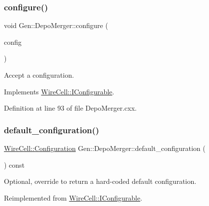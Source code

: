 \subsubsection{\texorpdfstring{configure()}{configure()}}
{\footnotesize\ttfamily void Gen\+::\+Depo\+Merger\+::configure (\begin{DoxyParamCaption}\item[{const \hyperlink{namespace_wire_cell_a9f705541fc1d46c608b3d32c182333ee}{Wire\+Cell\+::\+Configuration} \&}]{config }\end{DoxyParamCaption})\hspace{0.3cm}{\ttfamily [virtual]}}



Accept a configuration. 



Implements \hyperlink{class_wire_cell_1_1_i_configurable_a57ff687923a724093df3de59c6ff237d}{Wire\+Cell\+::\+I\+Configurable}.



Definition at line 93 of file Depo\+Merger.\+cxx.

\mbox{\label{class_wire_cell_1_1_gen_1_1_depo_merger_aeff369792193398df64bbc9bd90bdbab}} 
\subsubsection{\texorpdfstring{default\+\_\+configuration()}{default\_configuration()}}
{\footnotesize\ttfamily \hyperlink{namespace_wire_cell_a9f705541fc1d46c608b3d32c182333ee}{Wire\+Cell\+::\+Configuration} Gen\+::\+Depo\+Merger\+::default\+\_\+configuration (\begin{DoxyParamCaption}{ }\end{DoxyParamCaption}) const\hspace{0.3cm}{\ttfamily [virtual]}}



Optional, override to return a hard-\/coded default configuration. 



Reimplemented from \hyperlink{class_wire_cell_1_1_i_configurable_a54841b2da3d1ea02189478bff96f7998}{Wire\+Cell\+::\+I\+Configurable}.



